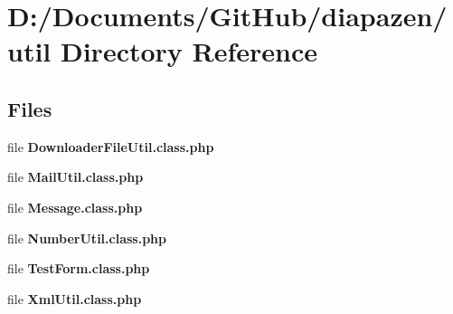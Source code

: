 \section{D\-:/\-Documents/\-Git\-Hub/diapazen/util Directory Reference}
\label{dir_c6f79fb76b58fcfd99d0b5de6ec19a00}
\subsection*{Files}
\begin{DoxyCompactItemize}
\item 
file {\bfseries Downloader\-File\-Util.\-class.\-php}
\item 
file {\bfseries Mail\-Util.\-class.\-php}
\item 
file {\bfseries Message.\-class.\-php}
\item 
file {\bfseries Number\-Util.\-class.\-php}
\item 
file {\bfseries Test\-Form.\-class.\-php}
\item 
file {\bfseries Xml\-Util.\-class.\-php}
\end{DoxyCompactItemize}
